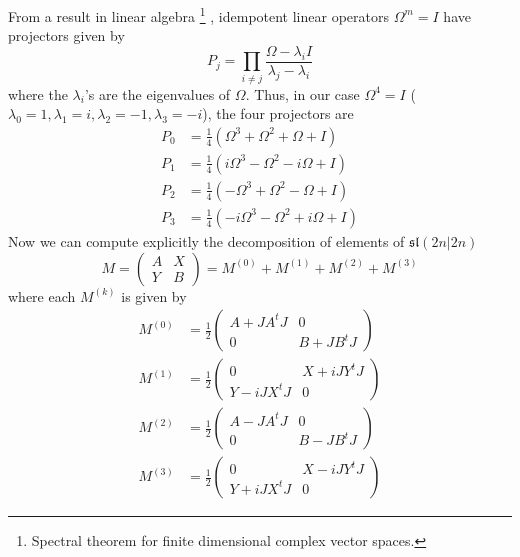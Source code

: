 \documentclass[a4paper,12pt]{article}
\numberwithin{equation}{section}
\numberwithin{thm}{section}
\numberwithin{exm}{section}
\newcommand{\<}{{\langle}}
\renewcommand{\>}{{\rangle}}
\newcommand{\mf}{\mathfrak}
\renewcommand{\l}{{\lambda}}
\newcommand{\Om}{{\Omega}}
\begin{document}
From a result in linear algebra%
\footnote{Spectral theorem for finite dimensional complex vector spaces.}%
, idempotent linear operators $\Om^m = I$ have projectors given by
	\begin{equation}
	P_j = \prod_{i\neq j} \frac{\Om - \l_i I}{\l_j - \l_i}
	\end{equation}
where the $\l_i$'s are the eigenvalues of $\Om$. Thus, in our case $\Om^4 = I$ ($\l_0 = 1, \l_1 = i, \l_2 = -1, \l_3 = -i$), the four projectors are
	\begin{align}
	P_0 & = \frac{1}{4} (\Om^3 + \Om^2 + \Om + I) \\
	P_1 & = \frac{1}{4} (i\Om^3 - \Om^2 -i \Om + I) \\
	P_2 & = \frac{1}{4} (-\Om^3 + \Om^2 - \Om + I) \\
	P_3 & = \frac{1}{4} (-i \Om^3 - \Om^2 + i\Om + I)
	\end{align}
Now we can compute explicitly the decomposition of elements of $\mf{sl}(2n|2n)$
	\begin{equation}
	M = \left(
		\begin{array}{cc}
		A & X \\
		Y & B
		\end{array}
	\right) = M^{(0)} + M^{(1)} + M^{(2)} + M^{(3)}
	\end{equation}
where each $M^{(k)}$ is given by
	\begin{align}
	M^{(0)} & = \frac{1}{2} \left(
		\begin{array}{cc}
		A + J A^t J & 0 \\
		0 & B + J B^t J
		\end{array}
	\right) \\
	M^{(1)} & = \frac{1}{2} \left(
		\begin{array}{cc}
		0 & X + i  J Y^t J \\
		Y - i J X^t J & 0
		\end{array}
	\right) \\
	M^{(2)} & = \frac{1}{2} \left(
		\begin{array}{cc}
		A - J A^t J & 0 \\
		0 & B - J B^t J
		\end{array}
	\right) \\
	M^{(3)} & = \frac{1}{2} \left(
		\begin{array}{cc}
		0 & X - i J Y^t J \\
		Y + i J X^t J & 0
		\end{array}
	\right)
	\end{align}
\end{document}
